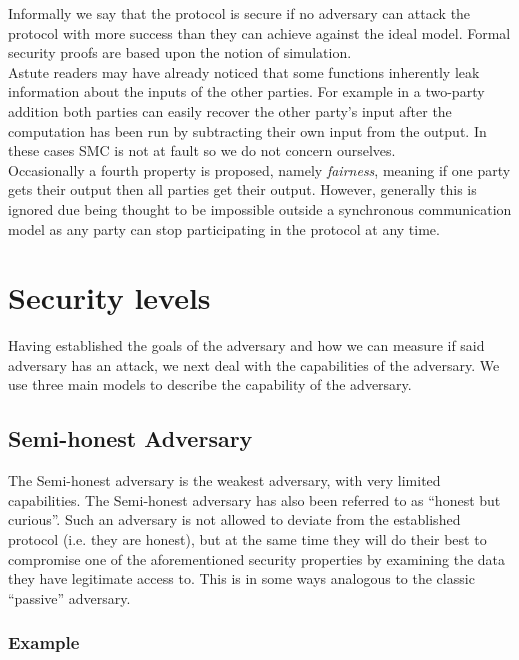 \documentclass[ %
                    author={Nicholas Tutte},
                supervisor={Prof. Nigel Smart},
                    degree={MEng},
                     title={Secure Two Party Computation},
                  subtitle={A practical comparison of recent protocols},
                      type={Research - GG1K},
                      year={2015} ]{dissertation}
\begin{document}
			Informally we say that the protocol is secure if no adversary can attack the protocol with more success than they can achieve against the ideal model. Formal security proofs are based upon the notion of simulation.\\

			Astute readers may have already noticed that some functions inherently leak information about the inputs of the other parties. For example in a two-party addition both parties can easily recover the other party's input after the computation has been run by subtracting their own input from the output. In these cases SMC is not at fault so we do not concern ourselves.\\

			Occasionally a fourth property is proposed, namely \emph{fairness}, meaning if one party gets their output then all parties get their output. However, generally this is ignored due being thought to be impossible outside a synchronous communication model as any party can stop participating in the protocol at any time.

		\section{Security levels}\label{sub:SecurityLevels}
			Having established the goals of the adversary and how we can measure if said adversary has an attack, we next deal with the capabilities of the adversary. We use three main models to describe the capability of the adversary.

			\subsection{Semi-honest Adversary}
				The Semi-honest adversary is the weakest adversary, with very limited capabilities. The Semi-honest adversary has also been referred to as ``honest but curious''. Such an adversary is not allowed to deviate from the established protocol (i.e. they are honest), but at the same time they will do their best to compromise one of the aforementioned security properties by examining the data they have legitimate access to. This is in some ways analogous to the classic ``passive'' adversary.

				\subsubsection{Example}
\end{document}

